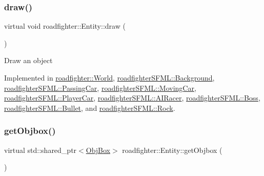 \subsubsection{\texorpdfstring{draw()}{draw()}}
{\footnotesize\ttfamily virtual void roadfighter\+::\+Entity\+::draw (\begin{DoxyParamCaption}{ }\end{DoxyParamCaption})\hspace{0.3cm}{\ttfamily [pure virtual]}}

Draw an object 

Implemented in \hyperlink{classroadfighter_1_1World_a90534263a154d6d7c1e8aef4e0138881}{roadfighter\+::\+World}, \hyperlink{classroadfighterSFML_1_1Background_a02b49875cfb5d0c77d30c2ddbc05c46f}{roadfighter\+S\+F\+M\+L\+::\+Background}, \hyperlink{classroadfighterSFML_1_1PassingCar_ae8d3cff5198ad85dde5ab864b0528337}{roadfighter\+S\+F\+M\+L\+::\+Passing\+Car}, \hyperlink{classroadfighterSFML_1_1MovingCar_afff9b85787e5af092cce59be3370a683}{roadfighter\+S\+F\+M\+L\+::\+Moving\+Car}, \hyperlink{classroadfighterSFML_1_1PlayerCar_a9676cb8164bbc20f2ddedccf73ec5ef8}{roadfighter\+S\+F\+M\+L\+::\+Player\+Car}, \hyperlink{classroadfighterSFML_1_1AIRacer_a50d966c9d59e09a155d69e2c2296fb4e}{roadfighter\+S\+F\+M\+L\+::\+A\+I\+Racer}, \hyperlink{classroadfighterSFML_1_1Boss_a73041bc4cc4446fcf4605abe1052aa03}{roadfighter\+S\+F\+M\+L\+::\+Boss}, \hyperlink{classroadfighterSFML_1_1Bullet_a37d6977eace695d237c8859a0bcd413c}{roadfighter\+S\+F\+M\+L\+::\+Bullet}, and \hyperlink{classroadfighterSFML_1_1Rock_a7416f3e77114d38994d0de4d78e9f403}{roadfighter\+S\+F\+M\+L\+::\+Rock}.

\mbox{\label{classroadfighter_1_1Entity_af14340d04a725175a6d221f23c35fa0c}} 
\subsubsection{\texorpdfstring{get\+Objbox()}{getObjbox()}}
{\footnotesize\ttfamily virtual std\+::shared\+\_\+ptr$<$\hyperlink{structObjBox}{Obj\+Box}$>$ roadfighter\+::\+Entity\+::get\+Objbox (\begin{DoxyParamCaption}{ }\end{DoxyParamCaption})\hspace{0.3cm}{\ttfamily [pure virtual]}}

